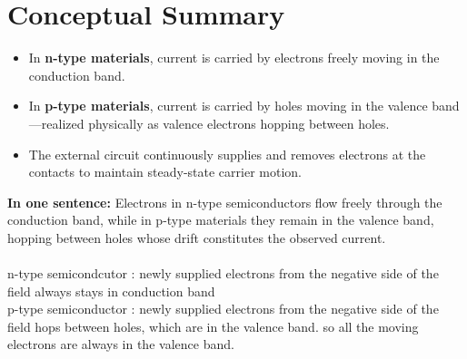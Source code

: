 \documentclass[12pt]{article}
\begin{document}
	\section{Conceptual Summary}
	\begin{itemize}
		\item In \textbf{n-type materials}, current is carried by electrons freely moving in the conduction band.
		\item In \textbf{p-type materials}, current is carried by holes moving in the valence band---realized physically as valence electrons hopping between holes.
		\item The external circuit continuously supplies and removes electrons at the contacts to maintain steady-state carrier motion.
	\end{itemize}
	
	\noindent
	\textbf{In one sentence:}  
	Electrons in n-type semiconductors flow freely through the conduction band, while in p-type materials they remain in the valence band, hopping between holes whose drift constitutes the observed current.\\\\
	n-type semicondcutor : newly supplied electrons from the negative side of the field always stays in conduction band\\
	p-type semiconductor : newly supplied electrons from the negative side of the field hops between holes, which are in the valence band. so all the moving electrons are always in the valence band.
	
\end{document}
